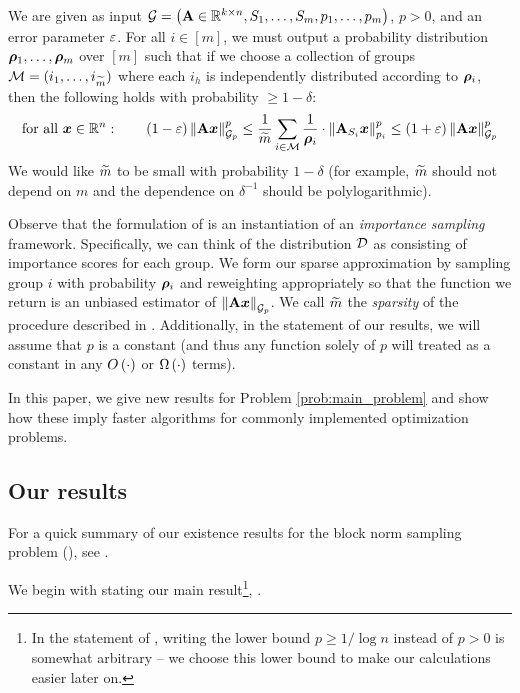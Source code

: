 \documentclass[11pt]{article}
\numberwithin{equation}{section}
\begin{document}
\begin{problem}
\label{prob:main_problem}
We are given as input $\mathcal{G} = \left(\mathbf{A} \in \mathbb{R}^{k\times n}, S_1,\dots,S_m, p_1,\dots,p_m\right)$, $p > 0$, and an error parameter $\varepsilon$. For all $i \in [m]$, we must output a probability distribution $\bm{\rho}_1,\dots,\bm{\rho}_m$ over $[m]$ such that if we choose a collection of groups $\mathcal{M} = (i_1,\dots,i_{\widetilde{m}})$ where each $i_h$ is independently distributed according to $\bm{\rho}_i$, then the following holds with probability $\ge 1-\delta$:
\begin{align}
    \text{for all } \bm{x} \in \mathbb{R}^n:\quad\quad\left(1-\varepsilon\right)\left\lVert \mathbf{A}\bm{x} \right\rVert_{\mathcal{G}_{p}}^p \le \frac{1}{\widetilde{m}}\sum_{i\in \mathcal{M}} \frac{1}{\bm{\rho}_i}\cdot\left\lVert \mathbf{A}_{S_i}\bm{x} \right\rVert_{p_i}^p \le \left(1+\varepsilon\right)\left\lVert \mathbf{A}\bm{x} \right\rVert_{\mathcal{G}_{p}}^p\label{eq:main_objective}
\end{align}
We would like $\widetilde{m}$ to be small with probability $1-\delta$ (for example, $\widetilde{m}$ should not depend on $m$ and the dependence on $\delta^{-1}$ should be polylogarithmic).
\end{problem}
Observe that the formulation of  is an instantiation of an \textit{importance sampling} framework. Specifically, we can think of the distribution $\mathcal{D}$ as consisting of importance scores for each group. We form our sparse approximation by sampling group $i$ with probability $\bm{\rho}_i$ and reweighting appropriately so that the function we return is an unbiased estimator of $\left\lVert \mathbf{A}\bm{x} \right\rVert_{\mathcal{G}_{p}}$. We call $\widetilde{m}$ the \textit{sparsity} of the procedure described in . Additionally, in the statement of our results, we will assume that $p$ is a constant (and thus any function solely of $p$ will treated as a constant in any $O\left(\cdot\right)$ or $\Omega\left(\cdot\right)$ terms). 

In this paper, we give new results for Problem \ref{prob:main_problem} and show how these imply faster algorithms for commonly implemented optimization problems.

\subsection{Our results}
\label{sec:results}

For a quick summary of our existence results for the block norm sampling problem (), see . 

We begin with stating our main result\footnote{In the statement of , writing the lower bound $p \ge 1/\log n$ instead of $p > 0$ is somewhat arbitrary -- we choose this lower bound to make our calculations easier later on.}, .
\end{document}
